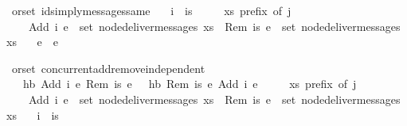 \begin{isabellebody}
\isamarkupfalse%
\ {\isacharparenleft}\ orset{\isacharparenright}\ ids{\isacharunderscore}imply{\isacharunderscore}messages{\isacharunderscore}same{\isacharcolon}\isanewline
\ \ \ {\isachardoublequoteopen}i\ {\isasymin}\ is{\isachardoublequoteclose}\isanewline
\ \ \ \ \ {\isachardoublequoteopen}xs\ prefix\ of\ j{\isachardoublequoteclose}\isanewline
\ \ \ \ \ {\isachardoublequoteopen}Add\ i\ e{}\ {\isasymin}\ set\ {\isacharparenleft}node{\isacharunderscore}deliver{\isacharunderscore}messages\ xs{\isacharparenright}{\isachardoublequoteclose}\ \ {\isachardoublequoteopen}Rem\ is\ e{}\ {\isasymin}\ set\ {\isacharparenleft}node{\isacharunderscore}deliver{\isacharunderscore}messages\ xs{\isacharparenright}{\isachardoublequoteclose}\isanewline
\ \ \ {\isachardoublequoteopen}e{}\ {\isacharequal}\ e{}{\isachardoublequoteclose}\isanewline
\end{isabellebody}

\begin{isabellebody}
\isamarkupfalse%
\ {\isacharparenleft}\ orset{\isacharparenright}\ concurrent{\isacharunderscore}add{\isacharunderscore}remove{\isacharunderscore}independent{\isacharcolon}\isanewline
\ \ \ {\isachardoublequoteopen}{\isasymnot}\ hb\ {\isacharparenleft}Add\ i\ e{}{\isacharparenright}\ {\isacharparenleft}Rem\ is\ e{}{\isacharparenright}{\isachardoublequoteclose}\ \ {\isachardoublequoteopen}{\isasymnot}\ hb\ {\isacharparenleft}Rem\ is\ e{}{\isacharparenright}\ {\isacharparenleft}Add\ i\ e{}{\isacharparenright}{\isachardoublequoteclose}\isanewline
\ \ \ \ \ {\isachardoublequoteopen}xs\ prefix\ of\ j{\isachardoublequoteclose}\isanewline
\ \ \ \ \ {\isachardoublequoteopen}Add\ i\ e{}\ {\isasymin}\ set\ {\isacharparenleft}node{\isacharunderscore}deliver{\isacharunderscore}messages\ xs{\isacharparenright}{\isachardoublequoteclose}\ \ {\isachardoublequoteopen}Rem\ is\ e{}\ {\isasymin}\ set\ {\isacharparenleft}node{\isacharunderscore}deliver{\isacharunderscore}messages\ xs{\isacharparenright}{\isachardoublequoteclose}\isanewline
\ \ \ {\isachardoublequoteopen}i\ {\isasymnotin}\ is{\isachardoublequoteclose}\isanewline
\end{isabellebody}

